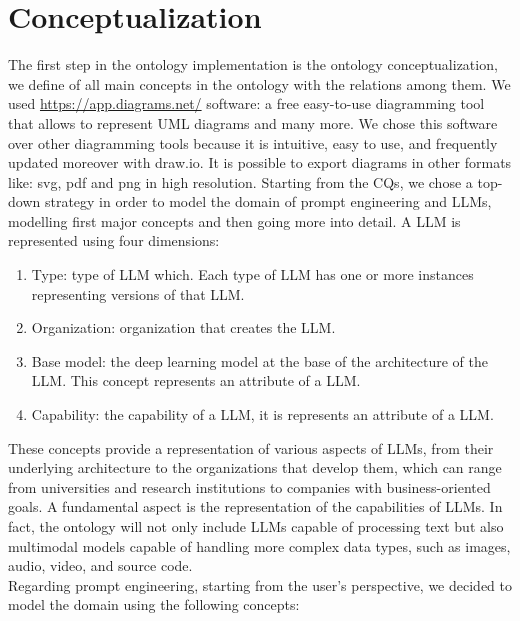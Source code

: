 \section{Conceptualization}
\label{section:4_1_conceptualization}
The first step in the ontology implementation is the ontology conceptualization, we define of all main concepts in the ontology with the relations among them.
We used \href{draw.io}{https://app.diagrams.net/} software: a free easy-to-use diagramming tool that allows to represent UML diagrams and many more. 
We chose this software over other diagramming tools because it is intuitive, easy to use, and frequently updated moreover with draw.io. It is possible to export diagrams in other formats like: svg, pdf and png in high resolution.
Starting from the CQs, we chose a top-down strategy in order to model the domain of prompt engineering and LLMs, modelling first major concepts and then going more into detail.
A LLM is represented using four dimensions:
\begin{enumerate}
    \item Type: type of LLM which. Each type of LLM has one or more instances representing versions of that LLM.

    \item Organization: organization that creates the LLM.

    \item Base model: the deep learning model at the base of the architecture of the LLM. This concept represents an attribute of a LLM.

    \item Capability: the capability of a LLM, it is represents an attribute of a LLM.
\end{enumerate}
These concepts provide a representation of various aspects of LLMs, from their underlying architecture to the organizations that develop them, which can range from universities and research institutions to companies with business-oriented goals.
A fundamental aspect is the representation of the capabilities of LLMs.
In fact, the ontology will not only include LLMs capable of processing text but also multimodal models capable of handling more complex data types, such as images, audio, video, and source code.\\
Regarding prompt engineering, starting from the user's perspective, we decided to model the domain using the following concepts:
